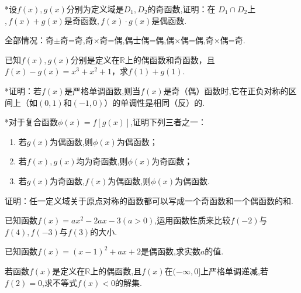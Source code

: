 \documentclass[lang=cn,math=cm,chinesefont=nofont,11pt,scheme=chinese,twocol]{elegantbook}
\begin{document}
\begin{exercise}
  *设$f(x),g(x)$分别为定义域是$D_1,D_2$的奇函数,证明：在 $D_1\cap D_2$上$,f(x)+g(x)$是奇函数$,f(x)\cdot g(x)$是偶函数.
\end{exercise}

\begin{remark}
  全部情况：奇$\pm$奇=奇,奇$\times$奇=偶,偶士偶=偶,偶×偶=偶,奇×偶=奇.
\end{remark}

\begin{exercise}
  已知$f(x),g(x)$分别是定义在$\mathbb{R}$上的偶函数和奇函数，且$f(x)-g(x)=x^3+x^2+1$，求$f(1)+g(1)$.
\end{exercise}

\begin{exercise}
  *证明：若$f(x)$是严格单调函数,则当$f(x)$是奇（偶）函数时,它在正负对称的区间上（如$(0,1)$和$(-1,0)$）的单调性是相同（反）的.
\end{exercise}

\begin{exercise}
  *对于复合函数$\phi(x)=f[g(x)]$,证明下列三者之一：
\end{exercise}

\begin{enumerate}
  \item 若$g(x)$为偶函数,则$\phi(x)$为偶函数；
  \item 若$f(x),g(x)$均为奇函数,则$\phi(x)$为奇函数；
  \item 若$g(x)$为奇函数,$f(x)$为偶函数,则$\phi(x)$为偶函数.
\end{enumerate}

\begin{exercise}
  证明：任一定义域关于原点对称的函数都可以写成一个奇函数和一个偶函数的和.
\end{exercise}

\begin{exercise}\label{2017RJB_bx1_P111.B7}
  已知函数$f(x)=ax^2-2ax-3(a>0)$,运用函数性质来比较$f(-2)$与$f(4),f(-3)$与$f(3)$的大小.
\end{exercise}

\begin{exercise}\label{2017RJB_bx1_P111.B8}
  已知函数$f(x)=(x-1)^2+ax+2$是偶函数,求实数$a$的值.
\end{exercise}

\begin{exercise}\label{2017RJB_bx1_P111.C2}
  若函数$f(x)$是定义在$\mathbb{R}$上的偶函数,且$f(x)$在$(-\infty,0]$上严格单调递减,若$f(2)=0$,求不等式$f(x)<0$的解集.
\end{exercise}
\end{document}
